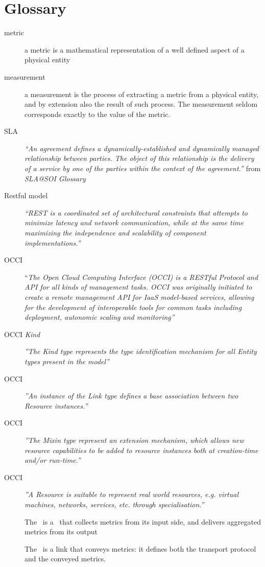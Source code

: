 
\section{Glossary}
\label{s:glossary}

\begin{description}
\item[metric] a metric is a mathematical representation of a well defined aspect of a physical entity
\item[measurement] a measurement is the process of extracting a metric from a physical entity, and by extension also the result of such process. The measurement seldom corresponds exactly to the value of the metric.
\item[SLA] {\em ``An agreement defines a dynamically-established and dynamically
managed relationship between parties. The object of this
relationship is the delivery of a service by one of the parties within
the context of the agreement.''} from {\em SLA@SOI Glossary}
\item[Restful model] {\em ``REST is a coordinated set of architectural constraints that attempts to minimize latency and network communication, while at the same time maximizing
the independence and scalability of component implementations.''} \cite{fie02a}
\item[OCCI] {``\em The Open Cloud Computing Interface (OCCI) is a RESTful Protocol and API for all kinds of management tasks. OCCI was originally initiated to create a remote management API for IaaS model-based services, allowing for the development of interoperable tools for common tasks including deployment, autonomic scaling and monitoring''} \cite{occi:core}
\item[OCCI {\em Kind}] {\em''The Kind type represents the type identification mechanism for all Entity types present in the model''} \cite{occi:core}
\item[OCCI {\em \ln}] {\em''An instance of the Link type defines a base association between two Resource instances.''} \cite{occi:core}
\item[OCCI \mi] {\em''The Mixin type represent an extension mechanism, which allows new resource
capabilities to be added to resource instances both at creation-time and/or run-time.''} \cite{occi:core}
\item[OCCI \rs] {\em''A Resource is suitable to represent real world resources, e.g. virtual machines, networks, services, etc. through specialisation.''} \cite{occi:core}
\item[\sens] The \sens\ is a \rs\ that collects metrics from its input side, and delivers aggregated metrics from its output
\item[\coll] The \coll\ is a link that conveys metrics: it defines both the transport protocol and the conveyed metrics.
\end{description}
